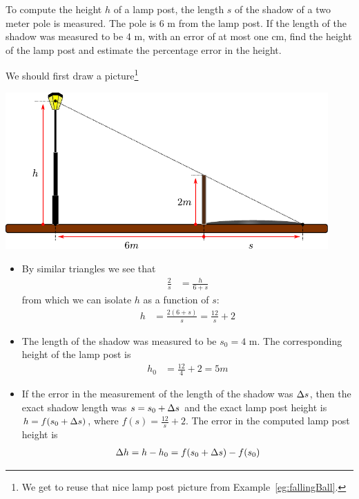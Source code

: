 \goodbreak

\begin{eg}\label{eg:taylorLamp}
To compute the height $h$ of a lamp post, the length $s$ of the
shadow of a two meter pole is measured. The pole is 6 m from the lamp post.
If the length of the shadow was measured to be 4 m, with an error of
at most one cm, find the height of the lamp post and estimate the
percentage error in the height.

\soln We should first draw a picture\footnote{We get to reuse that nice lamp post picture
from Example~\ref{eg:fallingBall}.}
\begin{efig}
 \begin{center}
  \includegraphics[height=6cm]{extra/lamp_shadow}
 \end{center}
\end{efig}
\begin{itemize}
\item By similar triangles we see that
\begin{align*}
    \frac{2}{s} &= \frac{h}{6+s}
\end{align*}
from which we can isolate $h$ as a function of $s$:
\begin{align*}
  h &= \frac{2(6+s)}{s} = \frac{12}{s} + 2
\end{align*}
\item The length of the shadow was measured to be $s_0=4$ m. The corresponding
height of the lamp post is
\begin{align*}
  h_0 &= \frac{12}{4} + 2 = 5m
\end{align*}

\item If the error in the measurement of the length of the shadow was $\Delta s$, then the
exact shadow length was $s=s_0+\Delta s$ and the exact lamp post height is $h=f(s_0+\Delta s)$,
where $f(s)=\tfrac{12}{s}+2$. The error in the computed lamp post height is
\begin{align*}
  \Delta h=h-h_0=f(s_0+\Delta s)-f(s_0)
\end{align*}


\end{itemize}
\end{eg}
